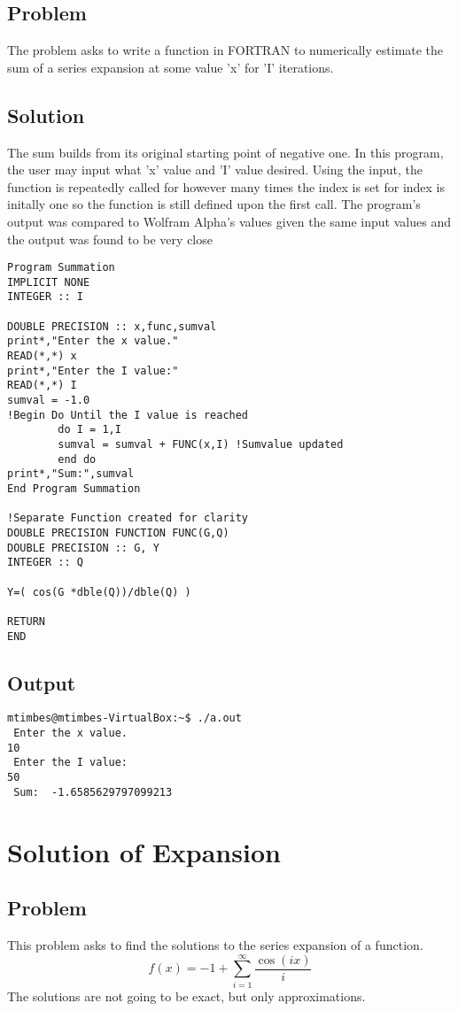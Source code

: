 \documentclass[12pt]{article}
\begin{document}
\subsection{Problem}
The problem asks to write a function in FORTRAN to numerically estimate the sum of a series expansion at some value 'x' for 'I' iterations. 
\subsection{Solution}
The sum builds from its original starting point of negative one. In this program, the user may input what 'x' value and 'I' value desired. Using the input, the function is repeatedly called for however many times the index is set for index is initally one so the function is still defined upon the first call. The program's output was compared to Wolfram Alpha's values given the same input values and the output was found to be very close
\begin{lstlisting}
Program Summation
IMPLICIT NONE
INTEGER :: I

DOUBLE PRECISION :: x,func,sumval
print*,"Enter the x value."
READ(*,*) x
print*,"Enter the I value:"
READ(*,*) I
sumval = -1.0
!Begin Do Until the I value is reached 
        do I = 1,I
        sumval = sumval + FUNC(x,I) !Sumvalue updated
        end do
print*,"Sum:",sumval
End Program Summation

!Separate Function created for clarity
DOUBLE PRECISION FUNCTION FUNC(G,Q)
DOUBLE PRECISION :: G, Y
INTEGER :: Q

Y=( cos(G *dble(Q))/dble(Q) )

RETURN
END
\end{lstlisting}
\subsection{Output}
\begin{lstlisting}
mtimbes@mtimbes-VirtualBox:~$ ./a.out
 Enter the x value.
10
 Enter the I value:
50
 Sum:  -1.6585629797099213  
\end{lstlisting}
\section{Solution of Expansion}
\subsection{Problem}
This problem asks to find the solutions to the series expansion of a function.
\begin{equation}
f(x) = -1 +\sum_{i=1}^{\infty} \frac{\cos(ix)}{i}
\end{equation}
The solutions are not going to be exact, but only approximations. 
\end{document}
